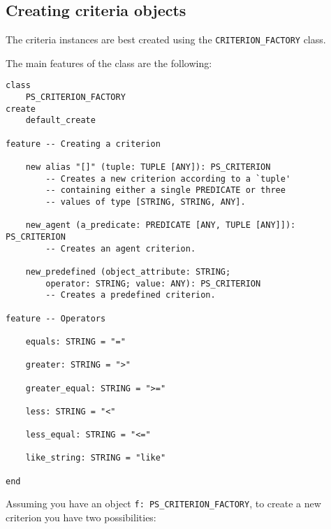 \documentclass[a4paper,12pt]{report}
\begin{document}
\subsection{Creating criteria objects}
\label{sec:creating_criteria_objects}
The criteria instances are best created using the \lstinline!CRITERION_FACTORY! class.

The main features of the class are the following: 

\begin{lstlisting}[language=OOSC2Eiffel, captionpos=b, caption={The CRITERION\_FACTORY class interface}, label={lst:factory_interface}]
class
	PS_CRITERION_FACTORY
create
	default_create

feature -- Creating a criterion

	new alias "[]" (tuple: TUPLE [ANY]): PS_CRITERION
		-- Creates a new criterion according to a `tuple'
		-- containing either a single PREDICATE or three 
		-- values of type [STRING, STRING, ANY].

	new_agent (a_predicate: PREDICATE [ANY, TUPLE [ANY]]): PS_CRITERION
		-- Creates an agent criterion.

	new_predefined (object_attribute: STRING; 
		operator: STRING; value: ANY): PS_CRITERION
		-- Creates a predefined criterion.

feature -- Operators

	equals: STRING = "="

	greater: STRING = ">"

	greater_equal: STRING = ">="

	less: STRING = "<"

	less_equal: STRING = "<="

	like_string: STRING = "like"

end
\end{lstlisting}

Assuming you have an object \lstinline{f: PS_CRITERION_FACTORY}, to create a new criterion you have  two possibilities:
\end{document}

